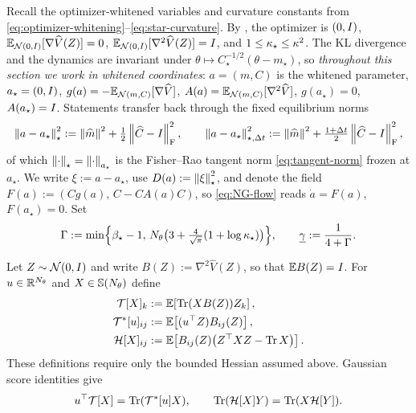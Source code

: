 Recall the optimizer-whitened variables and curvature constants from
\eqref{eq:optimizer-whitening}--\eqref{eq:star-curvature}.  By
, the optimizer is $(0,I)$,
$\mathbb{E}_{\mathcal{N}(0,I)}[\nabla\widehat V(Z)]=0$,
$\mathbb{E}_{\mathcal{N}(0,I)}[\nabla^2\widehat V(Z)]=I$, and
$1\leq\kappa_\star\leq\kappa^2$.  The KL divergence and the dynamics are invariant under
$\theta\mapsto C_\star^{-1/2}(\theta-m_\star)$, so \emph{throughout this section we work in
whitened coordinates}: $a=(m,C)$ is the whitened parameter,
$a_\star=(0,I)$, $g(a)=-\mathbb{E}_{\mathcal{N}(m,C)}[\nabla\widehat V]$,
$A(a)=\mathbb{E}_{\mathcal{N}(m,C)}[\nabla^2\widehat V]$, $g(a_\star)=0$, $A(a_\star)=I$. Statements
transfer back through the fixed equilibrium norms
\begin{equation}
\label{eq:local-norms}
    \left\lVert a-a_\star\right\rVert_\star^2:=\left\lVert \widehat m\right\rVert^2+\tfrac12\left\lVert \widehat C-I\right\rVert_{\mathrm{F}}^2,
    \qquad
    \left\lVert a-a_\star\right\rVert_{\star,\Delta t}^2:=\left\lVert \widehat m\right\rVert^2+\tfrac{1+\Delta t}2\left\lVert \widehat C-I\right\rVert_{\mathrm{F}}^2,
\end{equation}
of which $\left\lVert \cdot\right\rVert_\star=\left\lVert \cdot\right\rVert_{a_\star}$ is the Fisher--Rao tangent norm
\eqref{eq:tangent-norm} frozen at $a_\star$. We write $\xi:=a-a_\star$, use $D(a):=\left\lVert \xi\right\rVert_\star^2$,
and denote the field $F(a):=(Cg(a),\,C-CA(a)C)$, so \eqref{eq:NG-flow} reads $\dot a=F(a)$,
$F(a_\star)=0$. Set
\begin{equation}
\label{eq:Gamma}
    \Gamma:=\min\Bigl\{\beta_\star-1,\,N_\theta\bigl(3+\tfrac4{\sqrt\pi}(1+\log\kappa_\star)\bigr)\Bigr\},
    \qquad
    \underline{\gamma}:=\frac1{4+\Gamma} .
\end{equation}

\begin{definition}
\label{def:linear-score-ops}
Let $Z\sim\mathcal{N}(0,I)$ and write $B(Z):=\nabla^2\widehat V(Z)$, so that
$\mathbb{E} B(Z)=I$.  For $u\in\mathbb{R}^{N_\theta}$ and $X\in\mathbb{S}(N_\theta)$ define
\[
\begin{aligned}
    \mathcal T[X]_k
    &:=\mathbb{E}\!\left[\operatorname{Tr}(XB(Z))Z_k\right],\\
    \mathcal T^*[u]_{ij}
    &:=\mathbb{E}\!\left[(u^\top Z)B_{ij}(Z)\right],\\
    \mathcal H[X]_{ij}
    &:=\mathbb{E}\!\left[B_{ij}(Z)\bigl(Z^\top XZ-\operatorname{Tr} X\bigr)\right].
\end{aligned}
\]
These definitions require only the bounded Hessian assumed above.  Gaussian score
identities give
\[
    u^\top\mathcal T[X]=\operatorname{Tr}(\mathcal T^*[u]X),
    \qquad
    \operatorname{Tr}(\mathcal H[X]Y)=\operatorname{Tr}(X\mathcal H[Y]).
\]
\end{definition}

